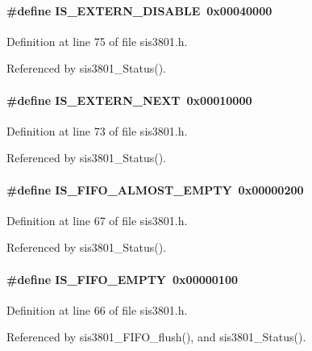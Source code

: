 \paragraph[{IS\_\-EXTERN\_\-DISABLE}]{\setlength{\rightskip}{0pt plus 5cm}\#define IS\_\-EXTERN\_\-DISABLE~0x00040000}\hfill\label{sis3801_8h_ad36736cbc74656f44d7de3f2f9bdb6c1}


Definition at line 75 of file sis3801.h.

Referenced by sis3801\_\-Status().
\paragraph[{IS\_\-EXTERN\_\-NEXT}]{\setlength{\rightskip}{0pt plus 5cm}\#define IS\_\-EXTERN\_\-NEXT~0x00010000}\hfill\label{sis3801_8h_a9f0ae1ee86718cd9affe179412b1f24d}


Definition at line 73 of file sis3801.h.

Referenced by sis3801\_\-Status().
\paragraph[{IS\_\-FIFO\_\-ALMOST\_\-EMPTY}]{\setlength{\rightskip}{0pt plus 5cm}\#define IS\_\-FIFO\_\-ALMOST\_\-EMPTY~0x00000200}\hfill\label{sis3801_8h_a0a30d30f9a69aa36c585ccc7956b6cfa}


Definition at line 67 of file sis3801.h.

Referenced by sis3801\_\-Status().
\paragraph[{IS\_\-FIFO\_\-EMPTY}]{\setlength{\rightskip}{0pt plus 5cm}\#define IS\_\-FIFO\_\-EMPTY~0x00000100}\hfill\label{sis3801_8h_acc0c19f969478ca190ac42882e475753}


Definition at line 66 of file sis3801.h.

Referenced by sis3801\_\-FIFO\_\-flush(), and sis3801\_\-Status().
